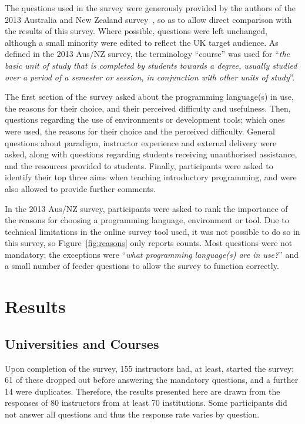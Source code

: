\documentclass[english]{programming}
\begin{document}
The questions used in the survey were generously provided by the
authors of the 2013 Australia and New Zealand
survey~\cite{mason+cooper:2014}, so as to allow direct comparison with
the results of this survey. Where possible, questions were left
unchanged, although a small minority were edited to reflect the UK
target audience. As defined in the 2013 Aus/NZ survey, the terminology
``course'' was used for ``{\emph{the basic unit of study that is
completed by students towards a degree, usually studied over a period
of a semester or session, in conjunction with other units of
study}}''.

The first section of the survey asked about the programming
language(s) in use, the reasons for their choice, and their perceived
difficulty and usefulness. Then, questions regarding the use of
environments or development tools; which ones were used, the reasons
for their choice and the perceived difficulty. General questions about
paradigm, instructor experience and external delivery were asked,
along with questions regarding students receiving unauthorised
assistance, and the resources provided to students. Finally,
participants were asked to identify their top three aims when
teaching introductory programming, and were also allowed to provide
further comments.

In the 2013 Aus/NZ survey, participants were asked to rank
the importance of the reasons for choosing a programming language,
environment or tool. Due to technical limitations in the online survey
tool used, it was not possible to do so in this survey, so
Figure~\ref{fig:reasons} only reports counts. Most questions were not
mandatory; the exceptions were ``{\emph{what programming language(s)
are in use?}}'' and a small number of feeder questions to allow the
survey to function correctly.


\section{Results}\label{results}

\subsection{Universities and Courses}

Upon completion of the survey, 155 instructors had, at least, started
the survey; 61 of these dropped out before answering the
mandatory questions, and a further 14 were duplicates. Therefore, the
results presented here are drawn from the responses of 80 instructors
from at least 70 institutions. Some participants did not answer all
questions and thus the response rate varies by question.
\end{document}
